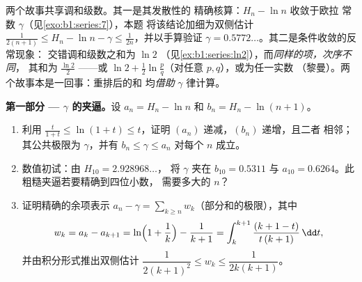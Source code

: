 \begin{problem}[{周末问题 --- $H_n = \ln n + \gamma +
\frac{1}{2n} + O(n^{-2})$，并将 $1 - \frac12 +
\frac13 - \dots$ 重排为 $\frac{\ln 2}{2}$}]
\label{pb:b1:series:1}
两个故事共享调和级数。其一是其发散性的
精确核算：$H_n - \ln n$ 收敛于欧拉
常数 $\gamma$（见\cref{exo:b1:series:7}），本题
将该结论加细为双侧估计 $\frac{1}{2(n+1)}
\leq H_n - \ln n - \gamma \leq \frac{1}{2n}$，并以手算验证 $\gamma
= 0.5772\dots$。其二是条件收敛的反常现象：
交错调和级数之和为 $\ln 2$
（见\cref{ex:b1:series:ln2}），而\emph{同样的项，次序不同}，
其和为 $\frac{\ln 2}{2}$ ——或 $\ln 2 +
\frac12\ln\frac pq$（对任意 $p, q$），或为任一实数
（黎曼）。两个故事本是一回事：重排后的和
均\emph{借助} $\gamma$ 律计算。

\medskip
\noindent\textbf{第一部分 --- $\gamma$ 的夹逼。}设 $a_n = H_n
- \ln n$ 和 $b_n = H_n - \ln(n+1)$。
\begin{enumerate}
  \item 利用 $\frac{t}{1+t} \leq \ln(1 + t) \leq t$，证明
        $(a_n)$ 递减，$(b_n)$ 递增，且二者
        相邻；其公共极限为 $\gamma$，并有 $b_n \leq
        \gamma \leq a_n$ 对每个 $n$ 成立。
  \item 数值初试：由 $H_{10} = 2.928968\dots$，
        将 $\gamma$ 夹在 $b_{10} = 0.5311$ 与 $a_{10} =
        0.6264$。此粗糙夹逼若要精确到四位小数，
        需要多大的 $n$？
  \item 证明精确的余项表示 $a_n - \gamma =
        \sum_{k \geq n} w_k$（部分和的极限），其中
        \[
        w_k = a_k - a_{k+1}
        = \ln\Bigl(1 + \frac1k\Bigr) - \frac{1}{k+1}
        = \int_k^{k+1} \frac{(k + 1 - t)}{t\,(k+1)}\,\dd t ,
        \]
        并由积分形式推出双侧估计
        $\dfrac{1}{2(k+1)^2} \leq w_k \leq \dfrac{1}{2k(k+1)}$。
\end{enumerate}


\end{problem}
